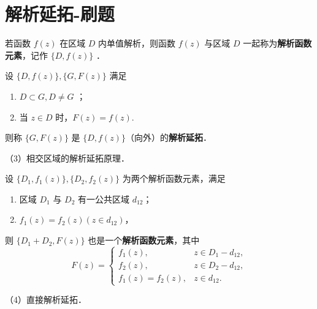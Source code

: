 \section{解析延拓-刷题}

\begin{definition}[定义 8.2]
若函数 $f(z)$ 在区域 $D$ 内单值解析，则函数 $f(z)$ 与区域 $D$ 一起称为\textbf{解析函数元素}，记作 $\{D, f(z)\}$ ．
\end{definition}
\begin{definition}[解析延拓的基础定义]
设 $\{D, f(z)\},\{G, F(z)\}$ 满足
	\begin{enumerate}
		\item $D \subset G, D \neq G$ ；
		\item 当 $z \in D$ 时，$F(z) = f(z)$.
	\end{enumerate}
则称 $\{G, F(z)\}$ 是 $\{D, f(z)\}$（向外）的\textbf{解析延拓}．
\end{definition}
（3）相交区域的解析延拓原理．

\begin{theorem}[定理8.1]
设 $\{D_1, f_1(z)\},\{D_2, f_2(z)\}$ 为两个解析函数元素，满足
	\begin{enumerate}
		\item 区域 $D_1$ 与 $D_2$ 有一公共区域 $d_{12}$；
		\item $f_1(z)=f_2(z)(z \in d_{12})$，
	\end{enumerate}
则 $\{D_1+D_2, F(z)\}$ 也是一个\textbf{解析函数元素}，其中
\[
F(z)= \begin{cases}f_1(z), & z \in D_1-d_{12}, \\ f_2(z), & z \in D_2-d_{12}, \\ f_1(z)=f_2(z), & z \in d_{12} .\end{cases}
\]
\end{theorem}
（4）直接解析延拓．

